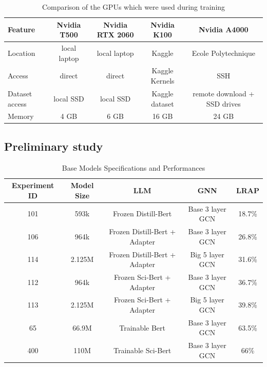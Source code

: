 \begin{table}[ht]
    \centering
    \begin{tabular}{lcccc}
    \hline
    \textbf{Feature} & \textbf{Nvidia T500} & \textbf{Nvidia RTX 2060} & \textbf{Nvidia K100} & \textbf{Nvidia A4000} \\ \hline
    Location            & local laptop           & local laptop  & Kaggle  & Ecole Polytechnique  \\
    Access & direct & direct & Kaggle Kernels & SSH \\
    Dataset access & local SSD & local SSD & Kaggle dataset & remote download + SSD drives\\ 
    Memory           & 4 GB                        & 6 GB                           & 16 GB                          & 24 GB                          \\
    \hline
    \end{tabular}
    \caption{Comparison of the GPUs which were used during training}
    \label{table:gpu_comparison}
\end{table}


\pagebreak

\subsection*{Preliminary study}
\label{sec:preliminary study}

\begin{table}[h]
    \centering
    \begin{tabular}{|c|c|c|c|c|}
    \hline
    \textbf{Experiment ID} & \textbf{Model Size} & \textbf{LLM} & \textbf{GNN} & \textbf{LRAP} \\ \hline
    101         & 593k                & Frozen Distill-Bert           & Base 3 layer GCN       & 18.7\%      \\ \hline
    106         & 964k                & Frozen Distill-Bert + Adapter & Base 3 layer GCN       & 26.8\%      \\ \hline
    114         & 2.125M              & Frozen Distill-Bert + Adapter & Big 5 layer GCN        & 31.6\%      \\ \hline
    112         & 964k                & Frozen Sci-Bert + Adapter     & Base 3 layer GCN       & 36.7\%      \\ \hline
    113         & 2.125M              & Frozen Sci-Bert + Adapter     & Big 5 layer GCN        & 39.8\%      \\ \hline
    65          & 66.9M               & Trainable Bert                & Base 3 layer GCN       & 63.5\%      \\ \hline
    400         & 110M                & Trainable Sci-Bert            & Base 3 layer GCN       & 66\%        \\ \hline
    \end{tabular}
    \caption{Base Models Specifications and Performances}
    \label{tab:preliminary_study_metrics}
\end{table}


